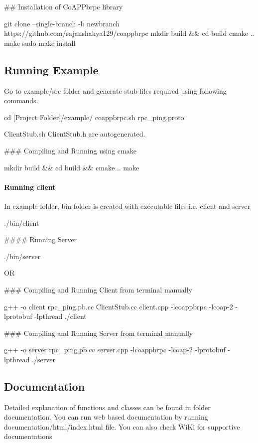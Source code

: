 \#\# Installation of Co\+A\+P\+Pbrpc library 
\begin{DoxyCode}
git clone --single-branch -b newbranch https://github.com/sajanshakya129/coappbrpc
mkdir build && cd build
cmake ..
make
sudo make install
\end{DoxyCode}


\subsection*{Running Example}

Go to example/src folder and generate stub files required using following commands. 
\begin{DoxyCode}
cd [Project Folder]/example/
coappbrpc.sh rpc\_ping.proto
\end{DoxyCode}
 Client\+Stub.\+sh Client\+Stub.\+h are autogenerated.

\#\#\# Compiling and Running using cmake 
\begin{DoxyCode}
mkdir build && cd build && cmake ..
make
\end{DoxyCode}
 \paragraph*{Running client}

In example folder, bin folder is created with executable files i.\+e. client and server 
\begin{DoxyCode}
./bin/client
\end{DoxyCode}
 \#\#\#\# Running Server 
\begin{DoxyCode}
./bin/server
\end{DoxyCode}
 OR

\#\#\# Compiling and Running Client from terminal manually 
\begin{DoxyCode}
g++ -o client rpc\_ping.pb.cc ClientStub.cc client.cpp -lcoappbrpc -lcoap-2 -lprotobuf -lpthread
./client
\end{DoxyCode}
 \#\#\# Compiling and Running Server from terminal manually 
\begin{DoxyCode}
g++ -o server rpc\_ping.pb.cc server.cpp -lcoappbrpc -lcoap-2 -lprotobuf -lpthread
./server
\end{DoxyCode}


\subsection*{Documentation}

Detailed explanation of functions and classes can be found in folder documentation. You can run web based documentation by running documentation/html/index.\+html file. You can also check Wi\+Ki for supportive documentations

